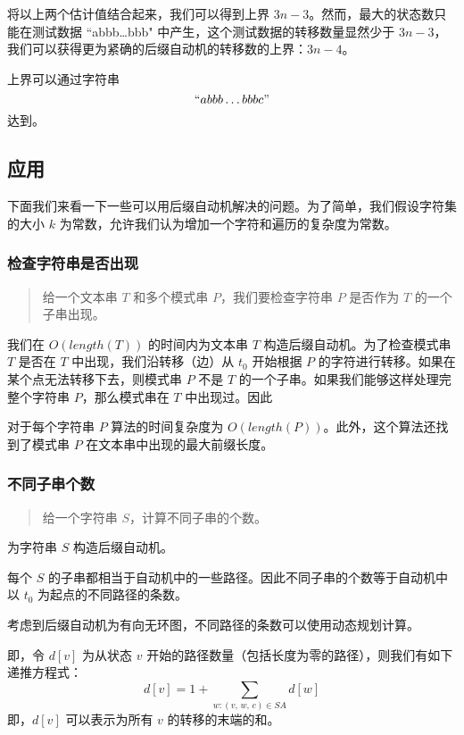 将以上两个估计值结合起来，我们可以得到上界
\(3n-3\)。然而，最大的状态数只能在测试数据 ``abbb\ldots bbb"
中产生，这个测试数据的转移数量显然少于
\(3n-3\)，我们可以获得更为紧确的后缀自动机的转移数的上界：\(3n-4\)。

上界可以通过字符串
\[
``abbb\ldots bbbc"
\]
达到。

\subsection{应用}

下面我们来看一下一些可以用后缀自动机解决的问题。为了简单，我们假设字符集的大小
\(k\) 为常数，允许我们认为增加一个字符和遍历的复杂度为常数。

\subsubsection{检查字符串是否出现}

\begin{quote}
给一个文本串 \(T\) 和多个模式串 \(P\)，我们要检查字符串 \(P\) 是否作为
\(T\) 的一个子串出现。
\end{quote}

我们在 \(O(length(T))\) 的时间内为文本串 \(T\)
构造后缀自动机。为了检查模式串 \(T\) 是否在 \(T\)
中出现，我们沿转移（边）从 \(t_0\) 开始根据 \(P\)
的字符进行转移。如果在某个点无法转移下去，则模式串 \(P\) 不是 \(T\)
的一个子串。如果我们能够这样处理完整个字符串 \(P\)，那么模式串在 \(T\)
中出现过。因此

对于每个字符串 \(P\) 算法的时间复杂度为
\(O(length(P))\)。此外，这个算法还找到了模式串 \(P\)
在文本串中出现的最大前缀长度。

\subsubsection{不同子串个数}

\begin{quote}
给一个字符串 \(S\)，计算不同子串的个数。
\end{quote}

为字符串 \(S\) 构造后缀自动机。

每个 \(S\)
的子串都相当于自动机中的一些路径。因此不同子串的个数等于自动机中以
\(t_0\) 为起点的不同路径的条数。

考虑到后缀自动机为有向无环图，不同路径的条数可以使用动态规划计算。

即，令 \(d[v]\) 为从状态 \(v\)
开始的路径数量（包括长度为零的路径），则我们有如下递推方程式：
\[
d[v]=1+\sum_{w:(v,\,w,\,c)\in SA}d[w]
\]
即，\(d[v]\) 可以表示为所有 \(v\) 的转移的末端的和。

